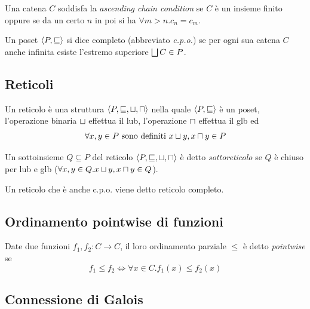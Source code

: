 \begin{definition}
Una catena $C$ soddisfa la \emph{ascending chain condition} se $C$ è un insieme finito oppure se da un certo $n$ in poi si ha $\forall m > n . c_n = c_m$.
\end{definition}

\begin{definition}
Un poset $\langle P, \sqsubseteq \rangle$ si dice completo (abbreviato \emph{c.p.o.}) se per ogni sua catena $C$ anche infinita esiste l'estremo superiore $\join[C] \in P$.
\end{definition}

\subsection{Reticoli}

\begin{definition}[Reticolo]
Un reticolo è una struttura $\struct{P, \sqsubseteq, \join, \meet}$ nella quale $\langle P, \sqsubseteq \rangle$ è un poset, l'operazione binaria $\join$ effettua il lub, l'operazione $\meet$ effettua il glb ed 
\[ \forall x,y \in P \text{ sono definiti } \join[x][y], \meet[x][y] \in P \]
\end{definition}

\begin{definition}[Sottoreticolo]
Un sottoinsieme $Q \subseteq P$ del reticolo $\struct{P, \sqsubseteq, \join, \meet}$ è detto \emph{sottoreticolo} se $Q$ è chiuso per lub e glb ($\forall x,y \in Q . \join[x][y], \meet[x][y] \in Q$). 
\end{definition}

\begin{definition}
Un reticolo che è anche c.p.o. viene detto reticolo completo.
\end{definition}

\subsection{Ordinamento pointwise di funzioni}

Date due funzioni $f_1, f_2 : C \to C$, il loro ordinamento parziale $\le$ è detto \emph{pointwise} se
\[ f_1 \le f_2 \iff \forall x \in C . f_1(x) \le f_2(x) \]

\subsection{Connessione di Galois}\label{sec:galois}

